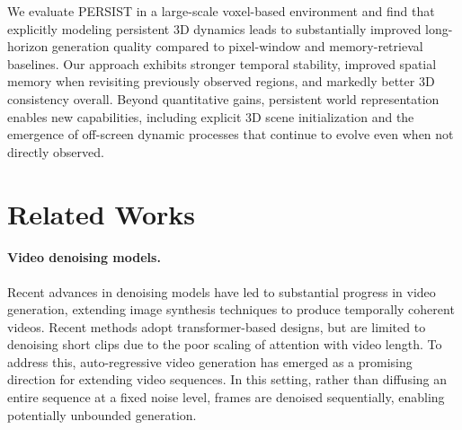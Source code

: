 \documentclass{article}
\theoremstyle{plain}
\theoremstyle{definition}
\theoremstyle{remark}
\begin{document}
We evaluate PERSIST in a large-scale voxel-based environment and find that explicitly modeling persistent 3D dynamics leads to substantially improved long-horizon generation quality compared to pixel-window and memory-retrieval baselines.
Our approach exhibits stronger temporal stability, improved spatial memory when revisiting previously observed regions, and markedly better 3D consistency overall.
Beyond quantitative gains, persistent world representation enables new capabilities, including explicit 3D scene initialization%
and the emergence of off-screen dynamic processes that continue to evolve even when not directly observed.

\section{Related Works}


\paragraph{Video denoising models.}
Recent advances in denoising models have led to substantial progress in video generation, extending image synthesis techniques to produce temporally coherent videos.
Recent methods adopt transformer-based designs, but are limited to denoising short clips due to the poor scaling of attention with video length. To address this, auto-regressive video generation has emerged as a promising direction for extending video sequences.
In this setting, rather than diffusing an entire sequence at a fixed noise level, frames are denoised sequentially, enabling potentially unbounded generation.
\end{document}
